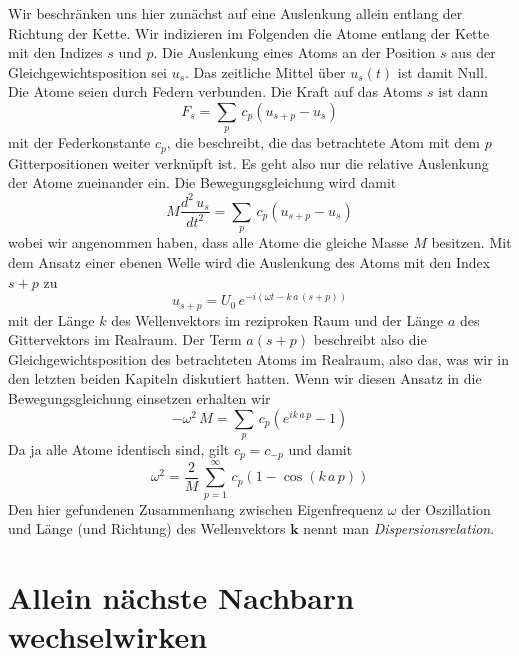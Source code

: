 Wir beschränken uns hier zunächst auf eine Auslenkung allein entlang der Richtung der Kette. Wir indizieren im Folgenden die Atome entlang der Kette mit den Indizes $s$ und $p$. Die Auslenkung eines Atoms an der Position $s$ aus der Gleichgewichtsposition sei $u_s$. 
Das zeitliche Mittel über $u_s(t)$ ist damit Null. Die Atome seien durch Federn verbunden. Die Kraft auf das Atoms $s$ ist dann
\begin{equation}
F_s = \sum_p \, c_p \left( u_{s+p} - u_s \right)
\end{equation}
mit der Federkonstante $c_p$, die beschreibt, die das betrachtete Atom mit dem $p$ Gitterpositionen weiter verknüpft ist. Es geht also nur die relative Auslenkung der Atome zueinander ein. Die Bewegungsgleichung wird damit
\begin{equation}
M \frac{d^2 \, u_s}{dt^2} = \sum_p \, c_p \left( u_{s+p} - u_s \right)
\end{equation}
wobei wir angenommen haben, dass alle Atome die gleiche Masse $M$ besitzen. Mit dem Ansatz einer ebenen Welle wird die Auslenkung des Atoms mit den Index $s+p$ zu
\begin{equation}
u_{s+p} = U_0 \, e^{-i ( \omega t - k \, a \, (s+p) )}
\end{equation}
mit der Länge $k$ des Wellenvektors  im reziproken Raum und der Länge $a$ des  Gittervektors  im Realraum. Der Term $a (s+p)$ beschreibt also die  Gleichgewichtsposition des betrachteten Atoms im Realraum, also das, was wir in den letzten beiden Kapiteln diskutiert hatten. Wenn wir diesen Ansatz in die Bewegungsgleichung einsetzen erhalten wir
\begin{equation}
- \omega^2 \, M = \sum_p \, c_p \left( e^{i  k \, a \, p} - 1 \right)
\end{equation}
Da ja alle Atome identisch sind, gilt $c_p = c_{-p}$ und damit
\begin{equation}
 \omega^2 =  \frac{2}{M} \, \sum_{p=1}^\infty \, c_p \left( 1 - \cos (  k \, a \, p ) \right)
\end{equation}
Den hier gefundenen Zusammenhang zwischen Eigenfrequenz $\omega$ der Oszillation und Länge (und Richtung) des Wellenvektors $\mathbf{k}$ nennt man \emph{Dispersionsrelation}.





\section{Allein nächste Nachbarn wechselwirken}

